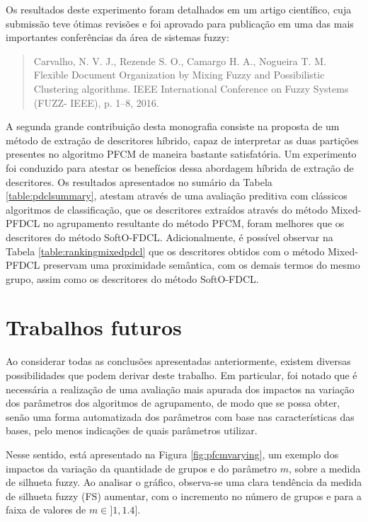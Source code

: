 Os resultados deste experimento foram detalhados em um artigo científico, cuja submissão teve ótimas revisões e foi aprovado para publicação em uma das mais importantes conferências da área de sistemas fuzzy:

\begin{quote}
Carvalho, N. V. J., Rezende S. O., Camargo H. A., Nogueira T. M. Flexible Document Organization by Mixing Fuzzy and Possibilistic Clustering algorithms. IEEE International Conference on Fuzzy Systems (FUZZ- IEEE), p. 1–8, 2016.
\end{quote}

A segunda grande contribuição desta monografia consiste na proposta de um método de extração de
descritores híbrido, capaz de interpretar as duas partições presentes no algoritmo PFCM de maneira
bastante satisfatória. Um experimento foi conduzido para atestar os
benefícios dessa abordagem híbrida de extração de descritores. Os resultados apresentados no sumário
da Tabela \ref{table:pdclsummary}, atestam através de uma avaliação preditiva com clássicos
algoritmos de classificação, que os descritores extraídos através do método Mixed-PFDCL no
agrupamento resultante do método PFCM, foram melhores que os descritores do método SoftO-FDCL.
Adicionalmente, é possível observar na Tabela \ref{table:rankingmixedpdcl} que os descritores obtidos com o método
Mixed-PFDCL preservam uma proximidade semântica, com os demais termos do mesmo grupo, assim como os
descritores do método SoftO-FDCL.

\section{Trabalhos futuros}

Ao considerar todas as conclusões apresentadas anteriormente, existem diversas possibilidades que
podem derivar deste trabalho. Em particular, foi notado que é necessária a realização de uma avaliação
mais apurada dos impactos na variação dos parâmetros dos algoritmos de agrupamento, de modo que se
possa obter, senão uma forma automatizada dos parâmetros com base nas características das bases,
pelo menos indicações de quais parâmetros utilizar. 

Nesse sentido, está apresentado na Figura \ref{fig:pfcmvarying}, um exemplo dos impactos da variação
da quantidade de grupos e do parâmetro $m$, sobre a medida de silhueta fuzzy. Ao analisar o gráfico,
observa-se uma clara tendência da medida de silhueta fuzzy (FS) aumentar, com o incremento no número
de grupos e para a faixa de valores de $m \in ]1,1.4]$. 

